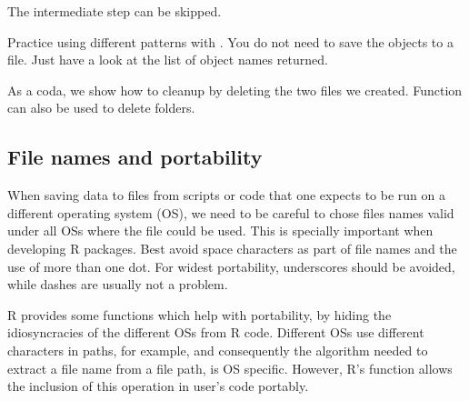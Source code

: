 \documentclass[krantz2]{krantz}\usepackage{knitr}%
\begin{document}
The intermediate step can be skipped.
\begin{knitrout}\footnotesize
{}\color{fgcolor}\begin{kframe}
\begin{alltt}
\hlstd{(} \hlstd{=} \hlstd{(} \hlstd{=} \hlstd{),}  \hlstd{=} \hlstd{)}
\end{alltt}
\end{kframe}
\end{knitrout}

\begin{playground}
Practice using different patterns with . You do not need to save the objects to a file. Just have a look at the list of object names returned.
\end{playground}

As a coda, we show how to cleanup by deleting the two files we created. Function  can also be used to delete folders.
\begin{knitrout}\footnotesize
{}\color{fgcolor}\begin{kframe}
\begin{alltt}
\hlstd{(}\hlstd{(}\hlstd{,} \hlstd{))}
\end{alltt}
\end{kframe}
\end{knitrout}

\subsection{File names and portability}\label{sec:files:filenames}

When saving data to files from scripts or code that one expects to be run on a different operating system (OS), we need to be careful to chose files names valid under all OSs where the file could be used. This is specially important when developing R packages. Best avoid space characters as part of file names and the use of more than one dot. For widest portability, underscores should be avoided, while dashes are usually not a problem.

R provides some functions which help with portability, by hiding the idiosyncracies of the different OSs from R code. Different OSs use different characters in paths, for example, and consequently the algorithm needed to extract a file name from a file path, is OS specific. However, R's function  allows the inclusion of this operation in user's code portably.
\end{document}
